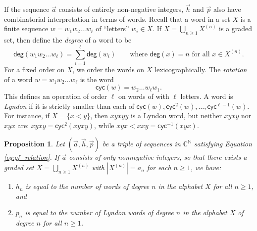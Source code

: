\documentclass[11pt]{amsart}
\newtheorem{proposition}[theorem]{Proposition}
\theoremstyle{definition}
\numberwithin{equation}{section}
\def\NN{{\mathbb N}}
\def\CC{{\mathbb C}}
\begin{document}
If the sequence $\vec{a}$ consists of entirely non-negative integers, $\vec{h}$ and $\vec{p}$ also have combinatorial interpretation in terms of words.
Recall that a word in a set $X$ is a finite sequence $w = w_{1} w_{2} \ldots w_{\ell}$ of ``letters'' $w_{i} \in X$.  
If $X = \bigcup_{n \geq 1} X^{(n)}$ is a graded set, then define the \emph{degree} of a word to be
\[
\mathsf{deg}(w_1 w_2 \ldots w_{\ell}) = \sum_{i = 1}^{\ell} \mathsf{deg}(w_{i})
\qquad\text{where $\mathsf{deg}(x) = n$ for all $x \in X^{(n)}$}.
\]
For a fixed order on $X$, we order the words on $X$ lexicographically.  
The \emph{rotation} of a word $w = w_{1} w_{2} \ldots w_{\ell}$ is the word
\[
\mathsf{cyc}(w) =  w_{2} \ldots w_{\ell} w_{1}.
\]
This defines an operation of order $\ell$ on words of with $\ell$ letters.  
A word is \emph{Lyndon} if it is strictly smaller than each of $\mathsf{cyc}(w), \mathsf{cyc}^{2}(w), \ldots, \mathsf{cyc}^{\ell-1}(w)$.  
For instance, if $X = \{x < y\}$, then $xyxyy$ is a Lyndon word, but neither $xyxy$ nor $xyx$ are: $xyxy = \mathsf{cyc}^{2}(xyxy)$, while $xyx < xxy = \mathsf{cyc}^{-1}(xyx)$.

\begin{proposition}
\label{prop:combinatorialinterpretation}
Let $(\vec{a}, \vec{h}, \vec{p})$ be a triple of sequences in $\CC^{\NN}$ satisfying Equation \eqref{eq:gf_relation}.  
If $\vec{a}$ consists of only nonnegative integers, so that there exists a graded set $X = \bigcup_{n \geq 1} X^{(n)}$ with $|X^{(n)}| = a_{n}$ for each $n \geq 1$, we have:
\begin{enumerate}[itemsep = 0.5em]
\item $h_n$ is equal to the number of words of degree $n$ in the alphabet $X$ for all $n \ge 1$, and 

\item $p_n$ is equal to the number of Lyndon words of degree $n$ in the alphabet $X$ of degree $n$ for all $n \ge 1$.

\end{enumerate}
\end{proposition}
\end{document}
